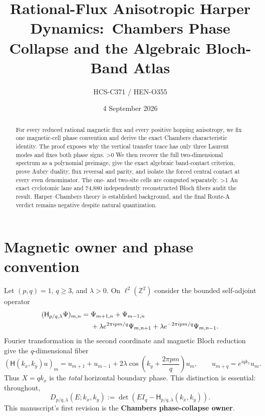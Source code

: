 \documentclass[10pt]{article}
\title{Rational-Flux Anisotropic Harper Dynamics:\
Chambers Phase Collapse and the Algebraic Bloch-Band Atlas}
\author{HCS-C371 / HEN-O355}
\date{4 September 2026}
\providecommand{\CRevisionRound}{2}
\newcommand{\HH}{\mathsf H}
\begin{document}
\maketitle

\begin{abstract}
For every reduced rational magnetic flux and every positive hopping
anisotropy, we fix one magnetic-cell phase convention and derive the exact
Chambers characteristic identity.  The proof exposes why the vertical
transfer trace has only three Laurent modes and fixes both phase signs.
\ifnum\CRevisionRound>0
We then recover the full two-dimensional spectrum as a polynomial preimage,
give the exact algebraic band-contact criterion, prove Aubry duality, flux
reversal and parity, and isolate the forced central contact at every even
denominator.  The one- and two-site cells are computed separately.
\fi
\ifnum\CRevisionRound>1
An exact cyclotomic lane and 74,880 independently reconstructed Bloch fibers
audit the result.  Harper--Chambers theory is established background, and
the final Route-A verdict remains negative despite natural quantization.
\fi
\end{abstract}

\section{Magnetic owner and phase convention}
Let $(p,q)=1$, $q\ge3$, and $\lambda>0$.  On
$\ell^2(\mathbb Z^2)$ consider the bounded self-adjoint operator
\begin{align}
 (\HH_{p/q,\lambda}\Psi)_{m,n}
 ={}&\Psi_{m+1,n}+\Psi_{m-1,n}\notag\\
 &+\lambda e^{2\pi i pm/q}\Psi_{m,n+1}
 +\lambda e^{-2\pi i pm/q}\Psi_{m,n-1}.
 \label{eq:lattice}
\end{align}
Fourier transformation in the second coordinate and magnetic Bloch
reduction give the $q$-dimensional fiber
\begin{equation}
 (\HH(k_x,k_y)u)_m=u_{m+1}+u_{m-1}
 +2\lambda\cos\!\left(k_y+\frac{2\pi pm}{q}\right)u_m,
 \qquad u_{m+q}=e^{iqk_x}u_m .
 \label{eq:fiber}
\end{equation}
Thus $X=qk_x$ is the \emph{total} horizontal boundary phase.  This
distinction is essential: throughout,
\begin{equation}
 D_{p/q,\lambda}(E;k_x,k_y)
 :=\det\!\left(EI_q-\HH_{p/q,\lambda}(k_x,k_y)\right).
 \label{eq:D}
\end{equation}
This manuscript's first revision is the \textbf{Chambers phase-collapse
owner}.
\end{document}
